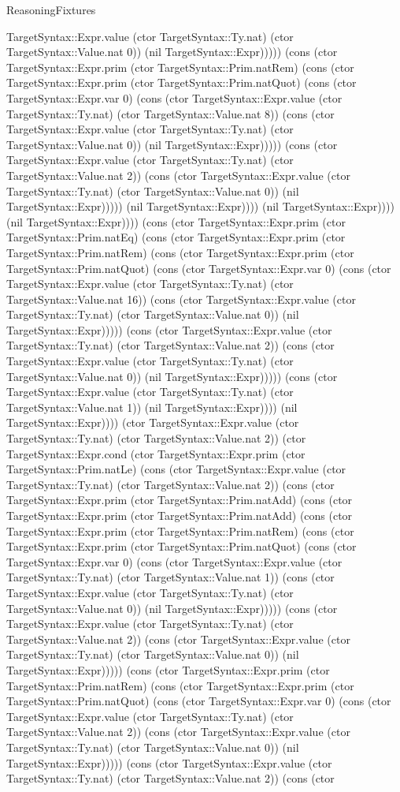 \begin{lexlean}{ReasoningFixtures}
\begin{semanticmodule}
{TargetSyntax::Expr.value (ctor TargetSyntax::Ty.nat) (ctor TargetSyntax::Value.nat 0)) (nil TargetSyntax::Expr))))) (cons (ctor TargetSyntax::Expr.prim (ctor TargetSyntax::Prim.natRem) (cons (ctor TargetSyntax::Expr.prim (ctor TargetSyntax::Prim.natQuot) (cons (ctor TargetSyntax::Expr.var 0) (cons (ctor TargetSyntax::Expr.value (ctor TargetSyntax::Ty.nat) (ctor TargetSyntax::Value.nat 8)) (cons (ctor TargetSyntax::Expr.value (ctor TargetSyntax::Ty.nat) (ctor TargetSyntax::Value.nat 0)) (nil TargetSyntax::Expr))))) (cons (ctor TargetSyntax::Expr.value (ctor TargetSyntax::Ty.nat) (ctor TargetSyntax::Value.nat 2)) (cons (ctor TargetSyntax::Expr.value (ctor TargetSyntax::Ty.nat) (ctor TargetSyntax::Value.nat 0)) (nil TargetSyntax::Expr))))) (nil TargetSyntax::Expr)))) (nil TargetSyntax::Expr)))) (nil TargetSyntax::Expr)))) (cons (ctor TargetSyntax::Expr.prim (ctor TargetSyntax::Prim.natEq) (cons (ctor TargetSyntax::Expr.prim (ctor TargetSyntax::Prim.natRem) (cons (ctor TargetSyntax::Expr.prim (ctor TargetSyntax::Prim.natQuot) (cons (ctor TargetSyntax::Expr.var 0) (cons (ctor TargetSyntax::Expr.value (ctor TargetSyntax::Ty.nat) (ctor TargetSyntax::Value.nat 16)) (cons (ctor TargetSyntax::Expr.value (ctor TargetSyntax::Ty.nat) (ctor TargetSyntax::Value.nat 0)) (nil TargetSyntax::Expr))))) (cons (ctor TargetSyntax::Expr.value (ctor TargetSyntax::Ty.nat) (ctor TargetSyntax::Value.nat 2)) (cons (ctor TargetSyntax::Expr.value (ctor TargetSyntax::Ty.nat) (ctor TargetSyntax::Value.nat 0)) (nil TargetSyntax::Expr))))) (cons (ctor TargetSyntax::Expr.value (ctor TargetSyntax::Ty.nat) (ctor TargetSyntax::Value.nat 1)) (nil TargetSyntax::Expr)))) (nil TargetSyntax::Expr)))) (ctor TargetSyntax::Expr.value (ctor TargetSyntax::Ty.nat) (ctor TargetSyntax::Value.nat 2)) (ctor TargetSyntax::Expr.cond (ctor TargetSyntax::Expr.prim (ctor TargetSyntax::Prim.natLe) (cons (ctor TargetSyntax::Expr.value (ctor TargetSyntax::Ty.nat) (ctor TargetSyntax::Value.nat 2)) (cons (ctor TargetSyntax::Expr.prim (ctor TargetSyntax::Prim.natAdd) (cons (ctor TargetSyntax::Expr.prim (ctor TargetSyntax::Prim.natAdd) (cons (ctor TargetSyntax::Expr.prim (ctor TargetSyntax::Prim.natRem) (cons (ctor TargetSyntax::Expr.prim (ctor TargetSyntax::Prim.natQuot) (cons (ctor TargetSyntax::Expr.var 0) (cons (ctor TargetSyntax::Expr.value (ctor TargetSyntax::Ty.nat) (ctor TargetSyntax::Value.nat 1)) (cons (ctor TargetSyntax::Expr.value (ctor TargetSyntax::Ty.nat) (ctor TargetSyntax::Value.nat 0)) (nil TargetSyntax::Expr))))) (cons (ctor TargetSyntax::Expr.value (ctor TargetSyntax::Ty.nat) (ctor TargetSyntax::Value.nat 2)) (cons (ctor TargetSyntax::Expr.value (ctor TargetSyntax::Ty.nat) (ctor TargetSyntax::Value.nat 0)) (nil TargetSyntax::Expr))))) (cons (ctor TargetSyntax::Expr.prim (ctor TargetSyntax::Prim.natRem) (cons (ctor TargetSyntax::Expr.prim (ctor TargetSyntax::Prim.natQuot) (cons (ctor TargetSyntax::Expr.var 0) (cons (ctor TargetSyntax::Expr.value (ctor TargetSyntax::Ty.nat) (ctor TargetSyntax::Value.nat 2)) (cons (ctor TargetSyntax::Expr.value (ctor TargetSyntax::Ty.nat) (ctor TargetSyntax::Value.nat 0)) (nil TargetSyntax::Expr))))) (cons (ctor TargetSyntax::Expr.value (ctor TargetSyntax::Ty.nat) (ctor TargetSyntax::Value.nat 2)) (cons (ctor }
\end{semanticmodule}
\end{lexlean}
